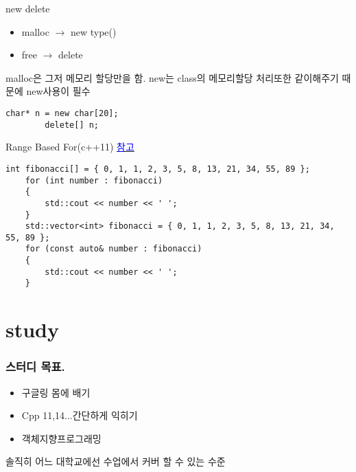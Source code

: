 \documentclass[10pt]{beamer}
\begin{document}

\begin{frame}[fragile]{new delete}
    \begin{itemize}
        \item malloc $\rightarrow$ new type()
        \item free $\rightarrow$ delete 
    \end{itemize}
    malloc은 그저 메모리 할당만을 함. new는 class의 메모리할당 처리또한 같이해주기 때문에 new사용이 필수
    \begin{lstlisting}[style = CStyle]
        char* n = new char[20];
        delete[] n;
    \end{lstlisting}
\end{frame}


\begin{frame}[fragile]{Range Based For(c++11)}
    \href{https://www.youtube.com/watch?v=sVoz36DYK5s&list=PLW_uvsSPlijtSmrhajc3Y02G86lOieQOb}{\textcolor{blue}{참고}}
    
    \begin{lstlisting}[style = CStyle]
    int fibonacci[] = { 0, 1, 1, 2, 3, 5, 8, 13, 21, 34, 55, 89 }; 
    for (int number : fibonacci)
    {
        std::cout << number << ' ';
    }
    std::vector<int> fibonacci = { 0, 1, 1, 2, 3, 5, 8, 13, 21, 34, 55, 89 }; 
    for (const auto& number : fibonacci) 
    {
        std::cout << number << ' ';
    }
    \end{lstlisting}

\end{frame}    

\section{study}


\begin{frame}[fragile] 
    \frametitle{스터디 목표.}
    \begin{itemize}
        \item 구글링 몸에 배기
        \item Cpp 11,14...간단하게 익히기
        \item 객체지향프로그래밍
    \end{itemize}
    솔직히 어느 대학교에선 수업에서 커버 할 수 있는 수준
\end{frame}
\end{document}
